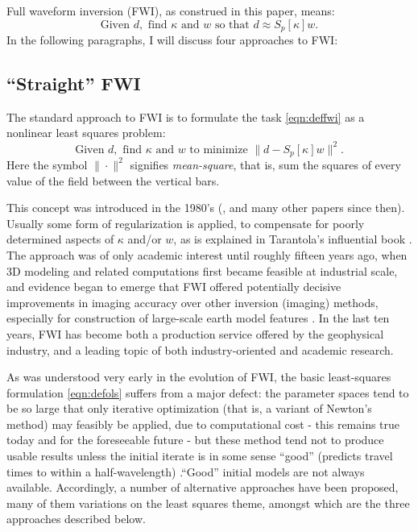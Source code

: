 Full waveform inversion (FWI), as construed in this paper, means:
\begin{equation}
  \label{eqn:deffwi}
  \mbox{Given } d, \mbox{ find }\kappa \mbox{ and }w \mbox{ so that }d
  \approx S_p[\kappa]w.
\end{equation}
In the following paragraphs, I will discuss four approaches to FWI:

\subsection{``Straight'' FWI}

The standard approach to FWI is to formulate the task \ref{eqn:deffwi}
as a nonlinear least squares problem:
\begin{equation}
  \label{eqn:defols}
  \mbox{Given } d, \mbox{ find }\kappa \mbox{ and }w \mbox{ to
    minimize }
  \| d -  S_p[\kappa]w\|^2.
\end{equation}
Here the symbol $\|\cdot\|^2$ signifies {\em mean-square}, that is,
sum the squares of every value of the field between the vertical bars.

This concept was introduced in the 1980's
(\cite{BamChavLai:79,Tara:84a,KolbColLai:86,Crasetal:90},
and many other papers since then). Usually some form of regularization
is applied, to compensate for poorly determined aspects of $\kappa$
and/or $w$, as is explained in Tarantola's influential book
\cite[]{Tarantola:05}. The approach was of only academic interest
until roughly fifteen years ago, when 3D modeling and related computations
first became feasible at industrial scale, and evidence began to emerge 
that FWI offered potentially decisive improvements in imaging accuracy
over other inversion (imaging) methods, especially for construction of
large-scale earth model features
\cite[]{Plessix:10,Vigh:10}. In the last ten years, FWI has become
both a production service offered by the geophysical industry, and a
leading topic of both industry-oriented and academic research. 

As was understood very early in the evolution of FWI, the basic
least-squares formulation \ref{eqn:defols} suffers from a major
defect: the parameter spaces tend to be so large that only iterative
optimization (that is, a variant
of Newton's method) may feasibly be applied, due to computational cost
- this remains true today and for the foreseeable future - but these
method tend not to produce usable results unless the initial iterate
is in some sense ``good'' (predicts travel times to within a
half-wavelength) \cite[]{GauTarVir:86,Plessix:10}.``Good'' initial models are not always
available. Accordingly, a number of alternative approaches have been
proposed, many of them variations on the least squares theme, amongst
which are the three approaches described below.

